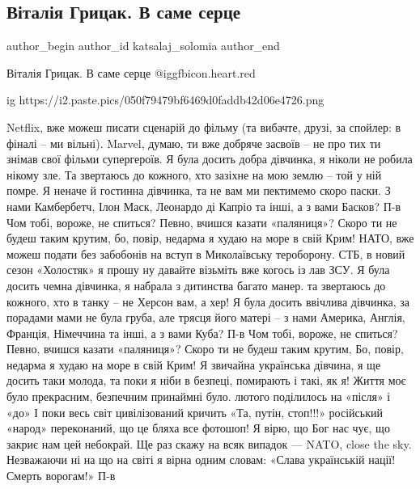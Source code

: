  
 
 
 
 
 
\subsection{Віталія Грицак. В саме серце}
\label{sec:17_03_2022.fb.katsalaj_solomia.1.vitalia_grycak_v_same_serce}
 
\ifcmt
 author_begin
   author_id katsalaj_solomia
 author_end
\fi

Віталія Грицак. В саме серце @igg{fbicon.heart.red}

\raggedcolumns
\begin{multicols}{2} %
\setlength{\parindent}{0pt}

\ifcmt
  ig https://i2.paste.pics/050f79479bf6469d0faddb42d06e4726.png
\fi

\obeycr
Netflix, вже можеш писати сценарій до фільму
\smallskip
(та вибачте, друзі, за спойлер: в фіналі – ми вільні).
\smallskip
Marvel, думаю, ти вже добряче засвоїв –
не про тих ти знімав свої фільми супергероїв. 
Я була досить добра дівчинка,
я ніколи не робила нікому зле.
\smallskip
Та звертаюсь до кожного, хто зазіхне
на мою землю – той у ній помре.
Я неначе й гостинна дівчинка, 
та не вам ми пектимемо скоро паски.
\smallskip
З нами Камбербетч, Ілон Маск, Леонардо ді Капріо та інші,
а з вами Басков?
\smallskip
П-в
\smallskip
Чом тобі, вороже, не спиться?
Певно, вчишся казати «паляниця»?
Скоро ти не будеш таким крутим,
бо, повір, недарма я худаю на море в свій Крим!
\smallskip
НАТО, вже можеш подати без забобонів
на вступ в Миколаївську тероборону.
СТБ, в новий сезон «Холостяк» я прошу 
ну давайте візьміть вже когось із лав ЗСУ. 
\smallskip
Я була досить чемна дівчинка,
я набрала з дитинства багато манер.
та звертаюсь до кожного, хто в танку –  
не Херсон вам, а хер!
\smallskip
Я була досить ввічлива дівчинка,
за порадами мами не була груба,
але трясця його матері – з нами Америка, Англія, Франція, Німеччина та інші,
а з вами Куба?
\smallskip
П-в
\smallskip
Чом тобі, вороже, не спиться?
Певно, вчишся казати «паляниця»?
Скоро ти не будеш таким крутим,
Бо, повір, недарма я худаю на море в свій Крим!
\smallskip
Я звичайна українська дівчина, я ще досить таки молода,
та поки я ніби в безпеці, помирають і такі, як я!
Життя моє було прекрасним, безпечним принаймні було.
 лютого поділилось на «після» і «до»
І поки весь світ цивілізований кричить «Та, путін, стоп!!!»
російський «народ» переконаний, що це бляха все фотошоп!
Я вірю, що Бог нас чує, що закриє нам цей небокрай.
\smallskip
Ще раз скажу на всяк випадок — NATO, close the sky.
Незважаючи ні на що на світі я вірна одним словам:
«Слава українській нації! Смерть ворогам!»
\smallskip
П-в
\restorecr
\end{multicols} %
